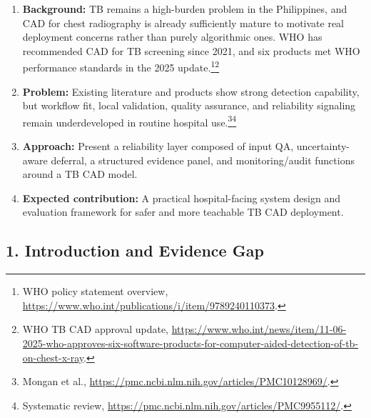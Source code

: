 \documentclass[11pt]{article}
\begin{document}
\begin{enumerate}[leftmargin=1.8em]
    \item \textbf{Background:} TB remains a high-burden problem in the Philippines, and CAD for chest radiography is already sufficiently mature to motivate real deployment concerns rather than purely algorithmic ones. WHO has recommended CAD for TB screening since 2021, and six products met WHO performance standards in the 2025 update.\footnote{WHO policy statement overview, \url{https://www.who.int/publications/i/item/9789240110373}.}\footnote{WHO TB CAD approval update, \url{https://www.who.int/news/item/11-06-2025-who-approves-six-software-products-for-computer-aided-detection-of-tb-on-chest-x-ray}.}
    \item \textbf{Problem:} Existing literature and products show strong detection capability, but workflow fit, local validation, quality assurance, and reliability signaling remain underdeveloped in routine hospital use.\footnote{Mongan et al., \url{https://pmc.ncbi.nlm.nih.gov/articles/PMC10128969/}.}\footnote{Systematic review, \url{https://pmc.ncbi.nlm.nih.gov/articles/PMC9955112/}.}
    \item \textbf{Approach:} Present a reliability layer composed of input QA, uncertainty-aware deferral, a structured evidence panel, and monitoring/audit functions around a TB CAD model.
    \item \textbf{Expected contribution:} A practical hospital-facing system design and evaluation framework for safer and more teachable TB CAD deployment.
\end{enumerate}

\subsection{1. Introduction and Evidence Gap}
\end{document}
